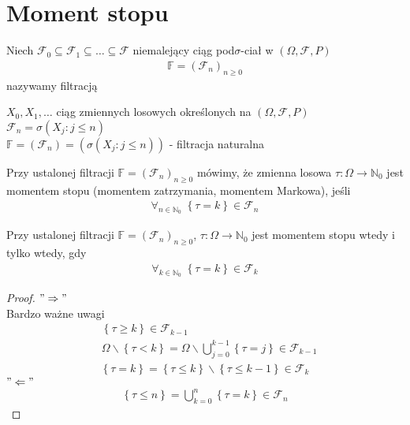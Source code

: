 \section{Moment stopu}
Niech $ \mathcal F _0\subseteq\mathcal F _1\subseteq\dots\subseteq \mathcal F  $ niemalejący ciąg pod$ \sigma $-ciał w $ (\Omega,\mathcal F ,P) $
\begin{gather*}
\mathbb F=(\mathcal F _n)_{n\ge0}
\end{gather*}
nazywamy filtracją
\begin{prz}
$ X_0,X_1,\dots  $ ciąg zmiennych losowych określonych na $ (\Omega,\mathcal F ,P) $\\
$ \mathcal F _n=\sigma\left(X_j:j\le n\right) $\\
$ \mathbb F=(\mathcal F _n)=\left(\sigma(X_j:j\le n)\right) $ - filtracja naturalna
\end{prz}
\begin{defi}
Przy ustalonej filtracji $ \mathbb F=(\mathcal F _n)_{n\ge 0} $ mówimy, że zmienna losowa $ \tau:\Omega\to \mathbb N _0 $ jest momentem stopu (momentem zatrzymania, momentem Markowa), jeśli
\begin{gather*}
\forall_{n\in \mathbb N _0}\;\left\{\tau=k\right\}\in \mathcal F _n
\end{gather*}
\end{defi}
\begin{twr}
Przy ustalonej filtracji $ \mathbb F=(\mathcal F _n)_{n\ge 0} $, $ \tau:\Omega\to \mathbb N _0 $ jest momentem stopu wtedy i tylko wtedy, gdy\begin{gather*}
\forall_{k\in \mathbb N _0}\;\left\{\tau=k\right\}\in \mathcal F _k
\end{gather*}
\begin{proof}
$ "\Rightarrow"$\\
Bardzo ważne uwagi
\begin{align*}
&\left\{\tau\ge k\right\}\in \mathcal F _{k-1}\\
&\Omega\backslash\left\{\tau<k\right\}=\Omega\backslash \bigcup_{j=0}^{k-1}\left\{\tau=j\right\}\in \mathcal F _{k-1}
\end{align*}
\begin{gather*}
\left\{\tau=k\right\}=\left\{\tau\le k\right\}\backslash\left\{\tau\le k-1\right\}\in \mathcal F _k
\end{gather*}
$ "\Leftarrow" $
\begin{gather*}
\left\{\tau\le n\right\}=\bigcup_{k=0}^n\left\{\tau=k\right\}\in \mathcal F _n
\end{gather*}
\end{proof}
\end{twr}
